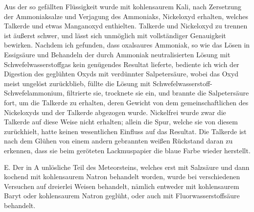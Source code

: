 \documentclass[a4paper, 11pt, oneside]{article}
\begin{document}
Aus der so gefällten Flüssigkeit wurde mit kohlensaurem Kali, nach Zersetzung der Ammoniaksalze und Verjagung des Ammoniaks, Nickeloxyd erhalten, welches Talkerde und etwas Manganoxyd enthielten. Talkerde und Nickeloxyd zu trennen ist äußerst schwer, und lässt sich unmöglich mit vollständiger Genauigkeit bewirken. Nachdem ich gefunden, dass oxalsaures Ammoniak, so wie das Lösen in Essigsäure und Behandeln der durch Ammoniak neutralisierten Lösung mit Schwefelwasserstoffgas kein genügendes Resultat lieferte, bediente ich wich der Digestion des geglühten Oxyds mit verdünnter Salpetersäure, wobei das Oxyd meist ungelöst zurückblieb, füllte die Lösung mit Schwefelwasserstoff-Schwefelammonium, filtrierte sie, trocknete sie ein, und brannte die Salpetersäure fort, um die Talkerde zu erhalten, deren Gewicht von dem gemeinschaftlichen des Nickeloxyds und der Talkerde abgezogen wurde. Nickelfrei wurde zwar die Talkerde auf diese Weise nicht erhalten; allein die Spur, welche sie von diesem zurückhielt, hatte keinen wesentlichen Einfluss auf das Resultat. Die Talkerde ist nach dem Glühen von einem andern gebrannten weißen Rückstand daran zu erkennen, dass sie beim geröteten Lackmuspapier die blaue Farbe wieder herstellt.

E. Der in A unlösliche Teil des Meteorsteins, welches erst mit Salzsäure und dann kochend mit kohlensaurem Natron behandelt worden, wurde bei verschiedenen Versuchen auf dreierlei Weisen behandelt, nämlich entweder mit kohlensaurem Baryt oder kohlensaurem Natron geglüht, oder auch mit Fluorwasserstoffsäure behandelt.
\end{document}
